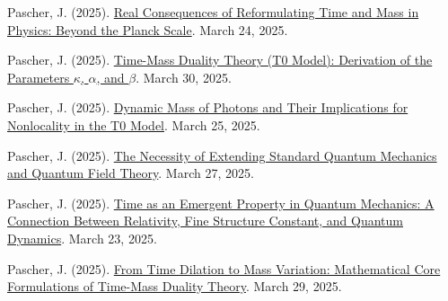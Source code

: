 \documentclass[a4paper,12pt]{article}
\begin{document}
	\begin{thebibliography}{99}
		
		 Pascher, J. (2025). \href{https://github.com/jpascher/T0-Time-Mass-Duality/tree/main/2/pdf/English/Jenseits%20der%20Planck-Skala_en.pdf}{Real Consequences of Reformulating Time and Mass in Physics: Beyond the Planck Scale}. March 24, 2025.
		
		 Pascher, J. (2025). \href{https://github.com/jpascher/T0-Time-Mass-Duality/tree/main/2/pdf/English/Zeit-Masse-Dualit%C3%A4tstheorie%20(T0-Modell)%20Herleitung%20der%20Parameter%20kappa,%20alpha%20und%20beta_en.pdf}{Time-Mass Duality Theory (T0 Model): Derivation of the Parameters \(\kappa\), \(\alpha\), and \(\beta\)}. March 30, 2025.
		
		 Pascher, J. (2025). \href{https://github.com/jpascher/T0-Time-Mass-Duality/tree/main/2/pdf/English/Dynamische%20Masse%20von%20Photonen%20und%20ihre%20Implikationen%20f%C3%BCr%20Nichtlokalit%C3%A4t_en.pdf}{Dynamic Mass of Photons and Their Implications for Nonlocality in the T0 Model}. March 25, 2025.
		
		 Pascher, J. (2025). \href{https://github.com/jpascher/T0-Time-Mass-Duality/tree/main/2/pdf/English/Die%20Notwendigkeit%20einer%20Erweiterung%20der%20Standard-Quantenmechanik%20und%20Quantenfeldtheorie_en.pdf}{The Necessity of Extending Standard Quantum Mechanics and Quantum Field Theory}. March 27, 2025.
		
		 Pascher, J. (2025). \href{https://github.com/jpascher/T0-Time-Mass-Duality/tree/main/2/pdf/English/Zeit%20als%20emergente%20Eigenschaft%20in%20der%20Quantenmechanik_en.pdf}{Time as an Emergent Property in Quantum Mechanics: A Connection Between Relativity, Fine Structure Constant, and Quantum Dynamics}. March 23, 2025.
		
		 Pascher, J. (2025). \href{https://github.com/jpascher/T0-Time-Mass-Duality/tree/main/2/pdf/English/Mathematische%20Formulierungen%20der%20Zeit-Masse-Dualit%C3%A4tstheorie%20mit%20Lagrange_en.pdf}{From Time Dilation to Mass Variation: Mathematical Core Formulations of Time-Mass Duality Theory}. March 29, 2025.

		
	\end{thebibliography}
	
\end{document}
